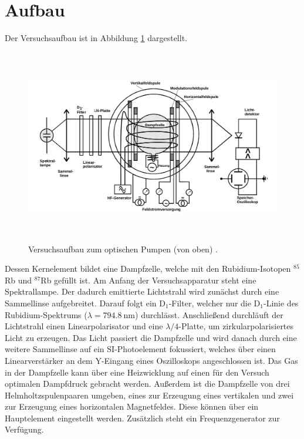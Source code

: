 \section{Aufbau}
\label{sec:Aufbau}

Der Versuchsaufbau ist in Abbildung \ref{fig:aufbau} dargestellt.
\begin{figure}
  \centering
  \includegraphics[height=8.5cm]{ressources/versuch.png}
  \caption{Versuchsaufbau zum optischen Pumpen (von oben) \cite{skript}.}
  \label{fig:aufbau}
\end{figure}
Dessen Kernelement bildet eine Dampfzelle, welche mit den Rubidium-Isotopen $^{85}$Rb und $^{87}$Rb gefüllt ist.
Am Anfang der Versuchsapparatur steht eine Spektrallampe.
Der dadurch emittierte Lichtstrahl wird zunächst durch eine Sammellinse aufgebreitet.
Darauf folgt ein D$_1$-Filter, welcher nur die D$_1$-Linie des Rubidium-Spektrums ($\lambda = \SI{794.8}{\nano\meter}$) durchlässt.
Anschließend durchläuft der Lichtstrahl einen Linearpolarisator und eine $\lambda/4$-Platte, um zirkularpolarisiertes Licht zu erzeugen.
Das Licht passiert die Dampfzelle und wird danach durch eine weitere Sammellinse auf ein SI-Photoelement fokussiert, welches über einen Linearverstärker an dem Y-Eingang eines Oszilloskops angeschlossen ist.
Das Gas in der Dampfzelle kann über eine Heizwicklung auf einen für den Versuch optimalen Dampfdruck gebracht werden.
Außerdem ist die Dampfzelle von drei Helmholtzspulenpaaren umgeben, eines zur Erzeugung eines vertikalen und zwei zur Erzeugung eines horizontalen Magnetfeldes.
Diese können über ein Hauptelement eingestellt werden.
Zusätzlich steht ein Frequenzgenerator zur Verfügung.
